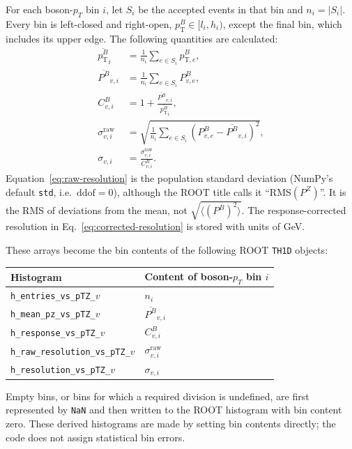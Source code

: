 \documentclass[11pt,a4paper]{article}
\begin{document}
For each boson-$p_T$ bin $i$, let $S_i$ be the accepted events in that bin and
$n_i=|S_i|$.  Every bin is left-closed and right-open,
$p_{\mathrm{T}}^B\in[l_i,h_i)$, except the final bin, which includes its upper
edge.  The following quantities are calculated:
\begin{align}
  \overline{p_{\mathrm{T}}^B}_i
    &=\frac{1}{n_i}\sum_{e\in S_i}p_{\mathrm{T},e}^B,\\
  \overline{P^B}_{v,i}
    &=\frac{1}{n_i}\sum_{e\in S_i}P^B_{v,e},\\
  C^B_{v,i}
    &=1+\frac{\overline{P^B}_{v,i}}
                   {\overline{p_{\mathrm{T}}^B}_i},
  \label{eq:response}\\
  \sigma^{\mathrm{raw}}_{v,i}
    &=\sqrt{\frac{1}{n_i}\sum_{e\in S_i}
       \left(P^B_{v,e}-\overline{P^B}_{v,i}\right)^2},
  \label{eq:raw-resolution}\\
  \sigma_{v,i}
    &=\frac{\sigma^{\mathrm{raw}}_{v,i}}{C^B_{v,i}}.
  \label{eq:corrected-resolution}
\end{align}
Equation~\eqref{eq:raw-resolution} is the population standard deviation
(NumPy's default \texttt{std}, i.e.\ \(\mathrm{ddof}=0\)), although the ROOT
title calls it ``RMS$(P^Z)$''.  It is the RMS of deviations from the mean, not
$\sqrt{\langle(P^B)^2\rangle}$.  The response-corrected resolution in
Eq.~\eqref{eq:corrected-resolution} is stored with units of GeV.

These arrays become the bin contents of the following ROOT \texttt{TH1D}
objects:
\begin{center}
\begin{tabular}{ll}
\toprule
Histogram & Content of boson-$p_T$ bin $i$ \\
\midrule
\texttt{h\_entries\_vs\_pTZ\_\(v\)} & $n_i$ \\
\texttt{h\_mean\_pz\_vs\_pTZ\_\(v\)} & $\overline{P^B}_{v,i}$ \\
\texttt{h\_response\_vs\_pTZ\_\(v\)} & $C^B_{v,i}$ \\
\texttt{h\_raw\_resolution\_vs\_pTZ\_\(v\)} & $\sigma^{\mathrm{raw}}_{v,i}$ \\
\texttt{h\_resolution\_vs\_pTZ\_\(v\)} & $\sigma_{v,i}$ \\
\bottomrule
\end{tabular}
\end{center}
Empty bins, or bins for which a required division is undefined, are first
represented by \texttt{NaN} and then written to the ROOT histogram with bin
content zero.  These derived histograms are made by setting bin contents
directly; the code does not assign statistical bin errors.
\end{document}
